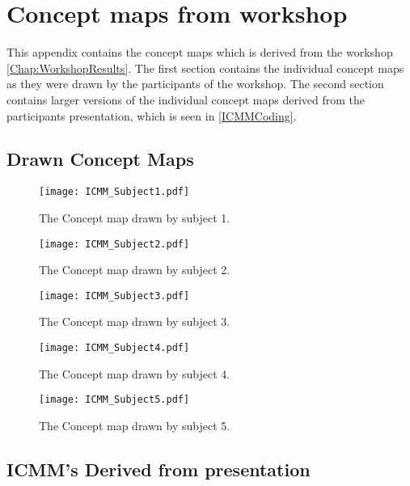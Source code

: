 \chapter{Concept maps from workshop}
\label{App:WorkshopConceptMaps}
This appendix contains the concept maps which is derived from the workshop \autoref{Chap:WorkshopResults}. The first section contains the individual concept maps as they were drawn by the participants of the workshop. The second section contains larger versions of the individual concept maps derived from the participants presentation, which is seen in \autoref{ICMMCoding}.

\section{Drawn Concept Maps}
\label{DrawnConceptMaps}
%
\begin{figure}[H]
	\centering
	\texttt{[image: ICMM\_Subject1.pdf]}
	\caption{The Concept map drawn by subject 1.}
	\label{fig:DrawnICMM1}
\end{figure}
%
\begin{figure}[H]
	\centering
	\texttt{[image: ICMM\_Subject2.pdf]}
	\caption{The Concept map drawn by subject 2.}
	\label{fig:DrawnICMM2}
\end{figure}
%
\begin{figure}[H]
	\centering
	\texttt{[image: ICMM\_Subject3.pdf]}
	\caption{The Concept map drawn by subject 3.}
	\label{fig:DrawnICMM3}
\end{figure}
%
\begin{figure}[H]
	\centering
	\texttt{[image: ICMM\_Subject4.pdf]}
	\caption{The Concept map drawn by subject 4.}
	\label{fig:DrawnICMM4}
\end{figure}
%
\begin{figure}[H]
	\centering
	\texttt{[image: ICMM\_Subject5.pdf]}
	\caption{The Concept map drawn by subject 5.}
	\label{fig:DrawnICMM5}
\end{figure}

\section{ICMM's Derived from presentation}
\label{PresentationICMM}
%